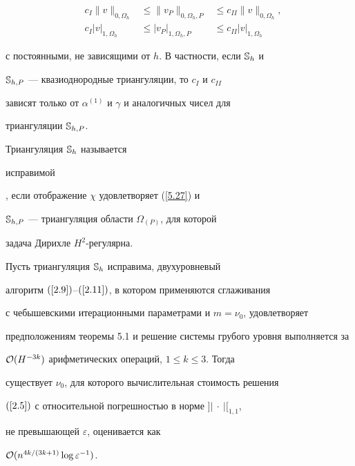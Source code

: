 \begin{equation}\label{5.27}


\begin{array}{llll}


&c_I\|v\|_{0,\Omega_h} &\le \|v_P\|_{0,\Omega_h,P}


&\le c_{II}\|v\|_{0,\Omega_h}, \\[2mm]


&c_I|v|_{1,\Omega_h} &\le |v_P|_{1,\Omega_h,P}&\le c_{II}|v|_{1,\Omega_h}


\end{array}


\end{equation}


с постоянными, не зависящими от $h$. В частности, если $\Bbb{S}_h$ и


$\Bbb{S}_{h,P}$ --- квазиоднородные триангуляции, то $c_I$ и $c_{II}$


зависят только от $\alpha^{(1)}$ и $\gamma$ и аналогичных чисел для


триангуляции $\Bbb{S}_{h,P}$. 





\begin{defns}


Триангуляция $\Bbb{S}_h$ называется {\em


исправимой}, если отображение $\chi$ удовлетворяет (\ref{5.27}) и


$\Bbb{S}_{h,P}$ --- триангуляция области $\Omega_{(P)}$, для которой


задача Дирихле $H^2$-регулярна.


\end{defns}





\begin{thms}


Пусть триангуляция $\Bbb{S}_h$ исправима, двухуровневый


алгоритм $(\ref{2.9})$--$(\ref{2.11})$, в котором применяются сглаживания


с чебышевскими итерационными параметрами и $m=\nu_0$, удовлетворяет


предположениям теоремы 5.1 и решение системы грубого уровня выполняется за


${\cal O}(H^{-3k})$ арифметических операций, $1\le k\le 3$. Тогда


существует $\nu_0$, для которого вычислительная стоимость решения


$(\ref{2.5})$ с относительной погрешностью в норме $]|\ \cdot\ |[_{1,1}$,


не превышающей $\varepsilon$, оценивается как


${\cal O}(n^{4k/(3k+1)}\log\varepsilon^{-1})$.


\end{thms}





